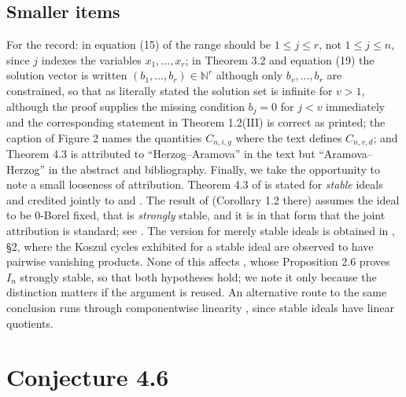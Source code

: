 \documentclass[a4paper,11pt,oneside,reqno]{amsart}
\theoremstyle{definition}
\theoremstyle{remark}
\theoremstyle{plain}
\newcommand{\NN}{\mathbb{N}}
\begin{document}
\subsection{Smaller items}

For the record: in equation (15) of \cite{Snellman2000} the range should be
\(1 \le j \le r\), not \(1 \le j \le n\), since \(j\) indexes the variables
\(x_1,\dots,x_r\); in Theorem 3.2 and equation (19) the solution vector is
written \((b_1,\dots,b_r) \in \NN^{r}\) although only \(b_v,\dots,b_r\) are
constrained, so that as literally stated the solution set is infinite for
\(v > 1\), although the proof supplies the missing condition \(b_j = 0\) for
\(j < v\) immediately and the corresponding statement in Theorem 1.2(III) is correct as
printed; the caption of Figure 2 names the quantities \(C_{n,i,g}\) where the
text defines \(C_{n,v,d}\); and Theorem 4.3 is attributed to
``Herzog--Aramova'' in the text but ``Aramova--Herzog'' in the abstract and
bibliography. Finally, we take the opportunity to note a small looseness of
attribution. Theorem 4.3 of \cite{Snellman2000} is stated for \emph{stable}
ideals and credited jointly to \cite{AramovaHerzog} and \cite{Peeva}. The
result of \cite{Peeva} (Corollary 1.2 there) assumes the ideal to be
\(0\)-Borel fixed, that is \emph{strongly} stable, and it is in that form that
the joint attribution is standard; see \cite[Thm.~6.16(6)]{McCulloughPeeva}.
The version for merely stable ideals is obtained in \cite{AramovaHerzog},
\S2, where the Koszul cycles exhibited for a stable ideal are observed to have
pairwise vanishing products. None of this affects \cite{Snellman2000}, whose
Proposition 2.6 proves \(I_n\) strongly stable, so that both hypotheses hold;
we note it only because the distinction matters if the argument is reused. An
alternative route to the same conclusion runs through componentwise linearity
\cite{HerzogReinerWelker}, since stable ideals have linear quotients.

\section{Conjecture 4.6}\label{sec:conjecture}
\end{document}

